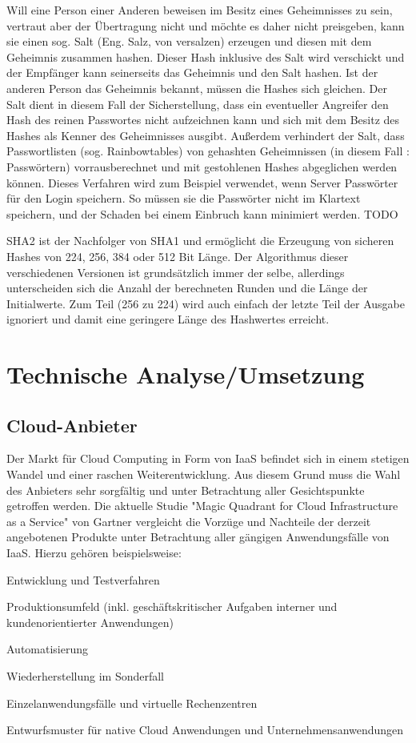 \documentclass[12pt,a4paper,bibliography=totocnumbered,listof=totocnumbered]{scrartcl}
\begin{document}
Will eine Person einer Anderen beweisen im Besitz eines Geheimnisses zu sein, vertraut aber der Übertragung nicht und möchte es daher nicht preisgeben, kann sie einen sog. Salt (Eng. Salz, von versalzen) erzeugen und diesen mit dem Geheimnis zusammen hashen. Dieser Hash inklusive des Salt wird verschickt und der Empfänger kann seinerseits das Geheimnis und den Salt hashen. Ist der anderen Person das Geheimnis bekannt, müssen die Hashes sich gleichen. Der Salt dient in diesem Fall der Sicherstellung, dass ein eventueller Angreifer den Hash des reinen Passwortes nicht aufzeichnen kann und sich mit dem Besitz des Hashes als Kenner des Geheimnisses ausgibt. Außerdem verhindert der Salt, dass Passwortlisten (sog. Rainbowtables) von gehashten Geheimnissen (in diesem Fall : Passwörtern) vorrausberechnet und mit gestohlenen Hashes abgeglichen werden können. Dieses Verfahren wird zum Beispiel verwendet, wenn Server Passwörter für den Login speichern. So müssen sie die Passwörter nicht im Klartext speichern, und der Schaden bei einem Einbruch kann minimiert werden. TODO

SHA2 ist der Nachfolger von SHA1 und ermöglicht die Erzeugung von sicheren Hashes von 224, 256, 384 oder 512 Bit Länge. Der Algorithmus dieser verschiedenen Versionen ist grundsätzlich immer der selbe, allerdings unterscheiden sich die Anzahl der berechneten Runden und die Länge der Initialwerte. Zum Teil (256 zu 224) wird auch einfach der letzte Teil der Ausgabe ignoriert und damit eine geringere Länge des Hashwertes erreicht. \cite{10}\cite{13}\\

\section{Technische Analyse/Umsetzung}\label{UmsetzungV}

\subsection{Cloud-Anbieter}
Der Markt für Cloud Computing in Form von IaaS befindet sich in einem stetigen Wandel und einer raschen Weiterentwicklung. Aus diesem Grund muss die Wahl des Anbieters sehr sorgfältig und unter Betrachtung aller Gesichtspunkte getroffen werden. Die aktuelle Studie "Magic Quadrant for Cloud Infrastructure as a Service" von Gartner \cite{30} vergleicht die Vorzüge und Nachteile der derzeit angebotenen Produkte unter Betrachtung aller gängigen Anwendungsfälle von IaaS. Hierzu gehören beispielsweise:
\begin{compactitem}
	\item Entwicklung und Testverfahren
	\item Produktionsumfeld (inkl. geschäftskritischer Aufgaben interner und kundenorientierter Anwendungen)
	\item Automatisierung
	\item Wiederherstellung im Sonderfall
	\item Einzelanwendungsfälle und virtuelle Rechenzentren
	\item Entwurfsmuster für native Cloud Anwendungen und Unternehmensanwendungen
\end{compactitem}
\end{document}
